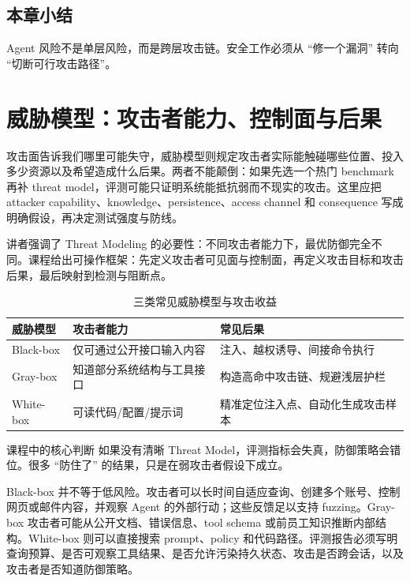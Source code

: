 \documentclass[a4paper]{article}
\begin{document}
\subsection{本章小结}
Agent 风险不是单层风险，而是跨层攻击链。安全工作必须从 ``修一个漏洞'' 转向 ``切断可行攻击路径''。

\section{威胁模型：攻击者能力、控制面与后果}

攻击面告诉我们哪里可能失守，威胁模型则规定攻击者实际能触碰哪些位置、投入多少资源以及希望造成什么后果。两者不能颠倒：如果先选一个热门 benchmark 再补 threat model，评测可能只证明系统能抵抗弱而不现实的攻击。这里应把 attacker capability、knowledge、persistence、access channel 和 consequence 写成明确假设，再决定测试强度与防线。

讲者强调了 Threat Modeling 的必要性：不同攻击者能力下，最优防御完全不同。课程给出可操作框架：先定义攻击者可见面与控制面，再定义攻击目标和攻击后果，最后映射到检测与阻断点。

\begin{table}[H]
\centering
\begin{tabular}{p{2.2cm}p{4.1cm}p{4.6cm}}
\toprule
\textbf{威胁模型} & \textbf{攻击者能力} & \textbf{常见后果} \\
\midrule
Black-box & 仅可通过公开接口输入内容 & 注入、越权诱导、间接命令执行 \\
Gray-box & 知道部分系统结构与工具接口 & 构造高命中攻击链、规避浅层护栏 \\
White-box & 可读代码/配置/提示词 & 精准定位注入点、自动化生成攻击样本 \\
\bottomrule
\end{tabular}
\caption{三类常见威胁模型与攻击收益}
\end{table}

\begin{importantbox}{课程中的核心判断}
如果没有清晰 Threat Model，评测指标会失真，防御策略会错位。很多 ``防住了'' 的结果，只是在弱攻击者假设下成立。
\end{importantbox}

Black-box 并不等于低风险。攻击者可以长时间自适应查询、创建多个账号、控制网页或邮件内容，并观察 Agent 的外部行动；这些反馈足以支持 fuzzing。Gray-box 攻击者可能从公开文档、错误信息、tool schema 或前员工知识推断内部结构。White-box 则可以直接搜索 prompt、policy 和代码路径。评测报告必须写明查询预算、是否可观察工具结果、是否允许污染持久状态、攻击是否跨会话，以及攻击者是否知道防御策略。
\end{document}
